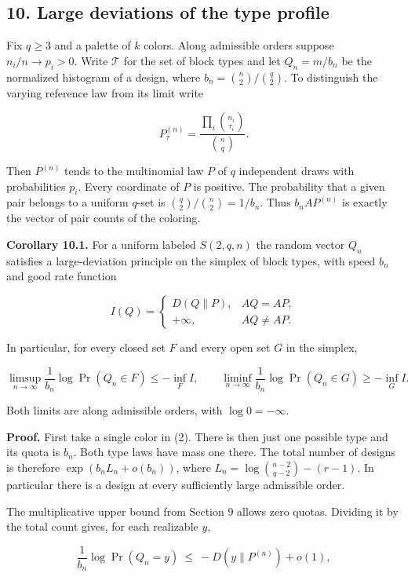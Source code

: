 \documentclass[english,11pt,a4paper]{article}
\begin{document}
\subsection{10. Large deviations of the type profile}\label{large-deviations-of-the-type-profile}

Fix \(q\ge3\) and a palette of \(k\) colors. Along admissible orders suppose \(n_i/n\to p_i>0\). Write \(\mathcal T\) for the set of block types and let \(Q_n=m/b_n\) be the normalized histogram of a design, where \(b_n=\binom n2/\binom q2\). To distinguish the varying reference law from its limit write

\[P^{(n)}_\tau=\frac{\prod_i\binom{n_i}{\tau_i}}{\binom n q}.\]

Then \(P^{(n)}\) tends to the multinomial law \(P\) of \(q\) independent draws with probabilities \(p_i\). Every coordinate of \(P\) is positive. The probability that a given pair belongs to a uniform \(q\)-set is \(\binom q2/\binom n2=1/b_n\). Thus \(b_nAP^{(n)}\) is exactly the vector of pair counts of the coloring.

\textbf{Corollary 10.1.} For a uniform labeled \(S(2,q,n)\) the random vector \(Q_n\) satisfies a large-deviation principle on the simplex of block types, with speed \(b_n\) and good rate function

\[I(Q)=
\begin{cases}
D(Q\|P),&AQ=AP,\\
+\infty,&AQ\ne AP.
\end{cases}
\tag{10.1}\]

In particular, for every closed set \(F\) and every open set \(G\) in the simplex,

\[\limsup_{n\to\infty}\frac1{b_n}\log\Pr(Q_n\in F)\le-\inf_F I,
\qquad
\liminf_{n\to\infty}\frac1{b_n}\log\Pr(Q_n\in G)\ge-\inf_G I.\]

Both limits are along admissible orders, with \(\log 0=-\infty\).

\textbf{Proof.} First take a single color in (2). There is then just one possible type and its quota is \(b_n\). Both type laws have mass one there. The total number of designs is therefore \(\exp(b_n L_n+o(b_n))\), where \(L_n=\log\binom{n-2}{q-2}-(r-1)\). In particular there is a design at every sufficiently large admissible order.

The multiplicative upper bound from Section 9 allows zero quotas. Dividing it by the total count gives, for each realizable \(y\),

\[\frac{1}{b_n}\log\Pr(Q_n=y)\ \le\ -D(y\|P^{(n)})+o(1),
\tag{10.2}\]
\end{document}
